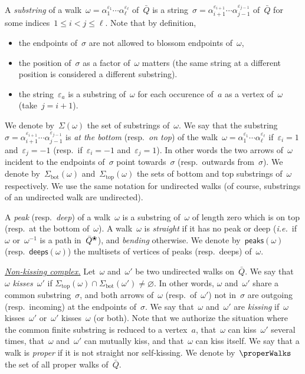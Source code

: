 \documentclass{amsart}
\theoremstyle{definition}
\newcommand{\ie}{\textit{i.e.}~} %
\newcommand{\darkblue}{\color{darkblue}} %
\newcommand{\defn}[1]{\textsl{\darkblue #1}} %
\newcommand{\para}[1]{\medskip\noindent\uline{\textit{#1.}}} %
\newcommand{\quiver}{\bar Q} %
\newcommand{\blossom}{^\text{\ding{96}}} %
\renewcommand{\top}{\mathrm{top}} %
\newcommand{\bottom}{\mathrm{bot}} %
\newcommand{\peaks}[1]{\mathsf{peaks}(#1)} %
\newcommand{\deeps}[1]{\mathsf{deeps}(#1)} %
\begin{document}
A \defn{substring} of a walk~$\omega = \alpha_1^{\varepsilon_1} \cdots \alpha_\ell^{\varepsilon_\ell}$ of~$\quiver$ is a string~$\sigma = \alpha_{i+1}^{\varepsilon_{i+1}} \cdots \alpha_{j-1}^{\varepsilon_{j-1}}$ of~$\quiver$ for some indices~$1 \le i < j \le \ell$. Note that by definition,
\begin{itemize}
\item the endpoints of~$\sigma$ are not allowed to blossom endpoints of~$\omega$,
\item the position of~$\sigma$ as a factor of~$\omega$ matters (the same string at a different position is considered a different substring).
\item the string~$\varepsilon_a$ is a substring of~$\omega$ for each occurence of~$a$ as a vertex of~$\omega$ (take~$j = i+1$).
\end{itemize}
We denote by~$\Sigma(\omega)$ the set of substrings of~$\omega$.
We say that the substring~$\sigma = \alpha_{i+1}^{\varepsilon_{i+1}} \cdots \alpha_{j-1}^{\varepsilon_{j-1}}$ is \defn{at the bottom} (resp.~\defn{on top}) of the walk~$\omega = \alpha_1^{\varepsilon_1} \cdots \alpha_\ell^{\varepsilon_\ell}$ if~$\varepsilon_i = 1$ and~$\varepsilon_j = -1$ (resp.~if~$\varepsilon_i = -1$ and~$\varepsilon_j = 1$).
In other words the two arrows of~$\omega$ incident to the endpoints of~$\sigma$ point towards~$\sigma$ (resp.~outwards from~$\sigma$).
We denote by~$\Sigma_\bottom(\omega)$ and~$\Sigma_\top(\omega)$ the sets of bottom and top substrings of~$\omega$ respectively.
We use the same notation for undirected walks (of course, substrings of an undirected walk are undirected).

A \defn{peak} (resp.~\defn{deep}) of a walk~$\omega$ is a substring of~$\omega$ of length zero which is on top (resp.~at the bottom of~$\omega$).
A walk~$\omega$ is \defn{straight} if it has no peak or deep (\ie if~$\omega$ or~$\omega^{-1}$ is a path in~$\quiver\blossom$), and \defn{bending} otherwise.
We denote by~$\peaks{\omega}$ (resp.~$\deeps{\omega}$) the multisets of vertices of peaks (resp.~deeps) of~$\omega$.

\para{Non-kissing complex}
%
Let~$\omega$ and~$\omega'$ be two undirected walks on~$\quiver$.
We say that~$\omega$ \defn{kisses}~$\omega'$ if ${\Sigma_\top(\omega) \cap \Sigma_\bottom(\omega')} \ne \varnothing$.
In other words, $\omega$ and~$\omega'$ share a common substring~$\sigma$, and both arrows of~$\omega$ (resp.~of~$\omega'$) not in~$\sigma$ are outgoing (resp.~incoming) at the endpoints of~$\sigma$.
We say that~$\omega$ and~$\omega'$ are \defn{kissing} if~$\omega$ kisses~$\omega'$ or~$\omega'$ kisses~$\omega$ (or both).
Note that we authorize the situation where the common finite substring is reduced to a vertex~$a$, that~$\omega$ can kiss~$\omega'$ several times, that~$\omega$ and~$\omega'$ can mutually kiss, and that~$\omega$ can kiss itself.
We say that a walk is \defn{proper} if it is not straight nor self-kissing.
We denote by~$\properWalks$ the set of all proper walks of~$\quiver$.
\end{document}
